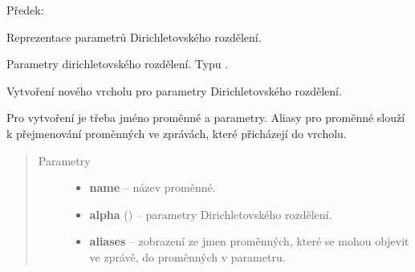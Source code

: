\begin{fulllineitems}
\label{alex.infer:alex.infer.factor.alex.infer.node.DirichletParameterNode}
Předek: {\hyperref[alex.infer:alex.infer.factor.alex.infer.node.VariableNode]{}}

Reprezentace parametrů Dirichletovského rozdělení.

\begin{fulllineitems}
\label{alex.infer:alex.infer.factor.alex.infer.node.DirichletParameterNode.alpha}
Parametry dirichletovského rozdělení. Typu {\hyperref[alex.infer:alex.infer.factor.Factor]{}}.

\end{fulllineitems}


\begin{fulllineitems}
\label{alex.infer:alex.infer.factor.alex.infer.node.DirichletParameterNode.__init__}
Vytvoření nového vrcholu pro parametry Dirichletovského rozdělení.

Pro vytvoření je třeba jméno proměnné a parametry.
Aliasy pro proměnné slouží k přejmenování proměnných ve zprávách, které
přicházejí do vrcholu.
\begin{quote}\begin{description}
\item[{Parametry}] \leavevmode\begin{itemize}
\item {} 
\textbf{name} -- název proměnné.

\item {} 
\textbf{alpha} ({\hyperref[alex.infer:alex.infer.factor.Factor]{}}) -- parametry Dirichletovského rozdělení.

\item {} 
\textbf{aliases} -- zobrazení ze jmen proměnných, které se mohou objevit ve zprávě, do proměnných v parametru.

\end{itemize}

\end{description}\end{quote}


\end{fulllineitems}
\end{fulllineitems}
